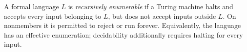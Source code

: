
A formal language $L$ is \emph{recursively enumerable} if a Turing machine halts and accepts every input belonging to $L$, but does not accept inputs outside $L$. On nonmembers it is permitted to reject or run forever. Equivalently, the language has an effective enumeration; decidability additionally requires halting for every input.
